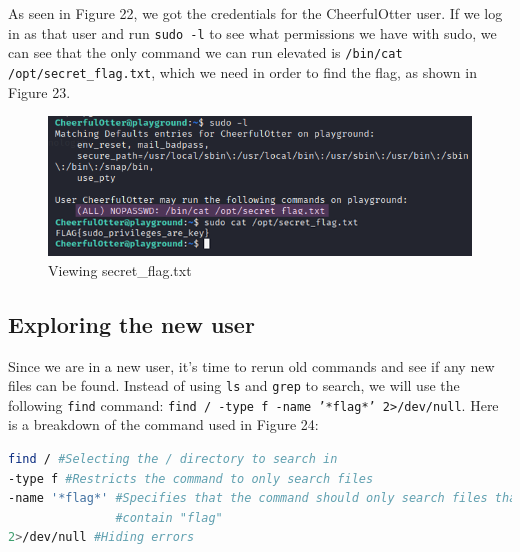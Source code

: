 \documentclass[a4paper]{article}
\newcommand{\abc}{\hfill \break}
\begin{document}
As seen in Figure 22, we got the credentials for the CheerfulOtter user. If we log in as that user and run \texttt{sudo -l} to see what permissions we have with sudo, we can see that the only command we can run elevated is \texttt{/bin/cat /opt/secret\_flag.txt}, which we need in order to find the flag, as shown in Figure 23.
\begin{figure}[h]
	\includegraphics[scale=0.45]{images/sh.png}
	\centering
	\caption{Viewing secret\_flag.txt}
\end{figure}\abc
\subsection{Exploring the new user}
Since we are in a new user, it's time to rerun old commands and see if any new files can be found. Instead of using \texttt{ls} and \texttt{grep} to search, we will use the following \texttt{find} command: \texttt{find / -type f -name '*flag*' 2>/dev/null}. Here is a breakdown of the command used in Figure 24:\cite{find}
\begin{lstlisting}[language=bash]
find / #Selecting the / directory to search in
-type f #Restricts the command to only search files
-name '*flag*' #Specifies that the command should only search files that 
               #contain "flag"
2>/dev/null #Hiding errors
\end{lstlisting}
\end{document}
